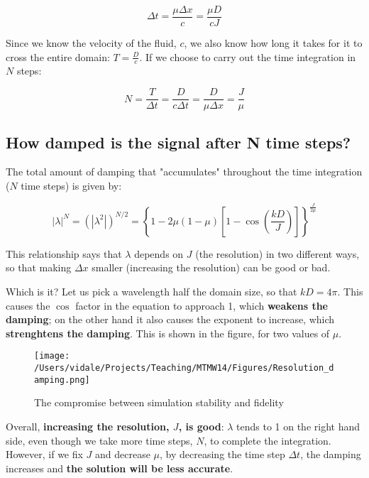 \begin{equation}
	\Delta t = \frac {\mu \Delta x}{c} = \frac {\mu D}{cJ}
\end{equation}

Since we know the velocity of the fluid, $c$, we also know how long it takes for it to cross the entire domain: $T=\frac {D}{c}$. If we choose to carry out the time integration in $N$ steps:

\begin{equation}
	N= \frac {T}{\Delta t} = \frac {D}{c \Delta t} = \frac {D}{\mu \Delta x} = \frac {J}{\mu}
\end{equation}



\subsection{How damped is the signal after N time steps?}
The total amount of damping that "accumulates" throughout the time integration ($N$ time steps) is given by:

\begin{equation}
	|\lambda|^N=(|\lambda^2|)^{N/2} = \left \{ 1 -2 \mu (1-\mu) \left[ 1 - \cos ( \frac {k D} {J}) \right] \right \} ^{\frac {J}{2 \mu}}
\end{equation}

This relationship says that $\lambda$ depends on $J$ (the resolution) in two different ways, so that making $\Delta x$ smaller (increasing the resolution) can be good or bad. 

\medskip
Which is it?
Let us pick a wavelength half the domain size, so that $kD=4 \pi$. This causes the $\cos$ factor in the equation to approach 1, which \textbf{weakens the damping}; on the other hand it also causes the exponent to increase, which \textbf{strenghtens the damping}. This is shown in the figure, for two values of $\mu$.

	\begin{figure}[h!]
		\texttt{[image: /Users/vidale/Projects/Teaching/MTMW14/Figures/Resolution\_damping.png]}
		\caption{The compromise between simulation stability and fidelity}
	\end{figure}

	Overall, \textbf{increasing the resolution, $J$, is good}: $\lambda$ tends to 1 on the right hand side, even though we take more time steps, $N$, to complete the integration. However, if we fix $J$ and decrease $\mu$, by decreasing the time step $\Delta t$, the damping increases and \textbf{the solution will be less accurate}. 

